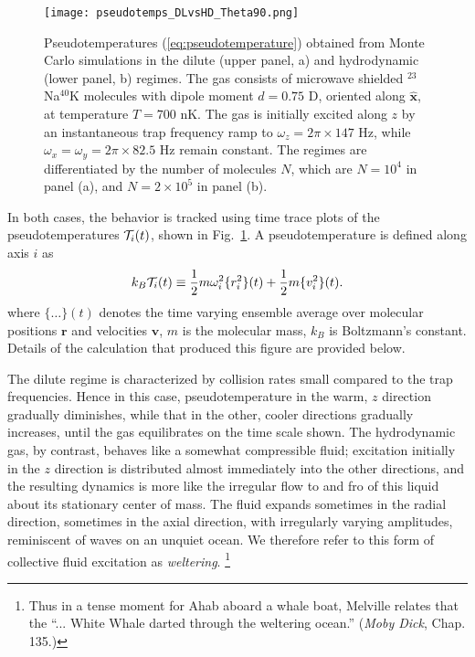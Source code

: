\documentclass[reprint, amsmath, amssymb, aps, superscriptaddress]{revtex4-1}
\begin{document}
\begin{figure}[ht]
    \centering
    \texttt{[image: pseudotemps\_DLvsHD\_Theta90.png]}
    \caption{ Pseudotemperatures (\ref{eq:pseudotemperature}) obtained from Monte Carlo simulations in the dilute (upper panel, a) and hydrodynamic (lower panel, b) regimes. 
    The gas consists of microwave shielded $^{23}$Na$^{40}$K molecules with dipole moment $d = 0.75$ D, oriented along $\hat{\boldsymbol{x}}$, at temperature $T = 700$ nK. 
    The gas is initially excited along $z$ by an instantaneous trap frequency ramp to $\omega_z = 2 \pi \times 147$ Hz, while $\omega_x = \omega_y = 2 \pi \times 82.5$ Hz remain constant.
    The regimes are differentiated by the number of molecules $N$, which are $N = 10^4$ in panel (a), and $N = 2 \times 10^5$ in panel (b). }
    \label{fig:pseudotemps_DLvsHD_Theta90}
\end{figure}


In both cases, the behavior is tracked using time trace plots of the pseudotemperatures ${\cal T}_i(t)$, shown in Fig.~\ref{fig:pseudotemps_DLvsHD_Theta90}. A pseudotemperature is defined along axis $i$ as \cite{Sykes15_PRA}
\begin{align} \label{eq:pseudotemperature}
    k_B {\cal T}_i(t)
    \equiv 
    \frac{ 1 }{ 2 }
    m \omega_i^2 \{ r_i^2 \}(t)
    +
    \frac{ 1 }{ 2 }
    m \{ v_i^2 \}(t).
\end{align}
where $\{ \ldots \}(t)$ denotes the time varying ensemble average over molecular positions $\boldsymbol{r}$ and velocities $\boldsymbol{v}$, $m$ is the molecular mass, $k_B$ is Boltzmann's constant. 
Details of the calculation that produced this figure are provided below.
 
 

The dilute regime is characterized by collision rates small compared to the trap frequencies.  Hence in this case, pseudotemperature in the warm, $z$ direction gradually diminishes, while that in the other, cooler directions gradually increases, until the gas equilibrates on the time scale shown.  The hydrodynamic gas, by contrast, behaves like a somewhat compressible fluid;  excitation initially in the $z$ direction is distributed almost immediately into the other directions, and the resulting dynamics is more like the irregular flow to and fro of this liquid about its stationary center of mass. The fluid expands sometimes in the radial direction, sometimes in the axial direction, with irregularly varying amplitudes, reminiscent of waves on an unquiet ocean.
We therefore refer to this form of collective fluid excitation as {\it weltering}. \footnote{ Thus in a tense moment for Ahab aboard a whale boat, Melville relates that the ``... White Whale darted through the weltering ocean.'' ({\it Moby Dick}, Chap. 135.) } 
\end{document}
